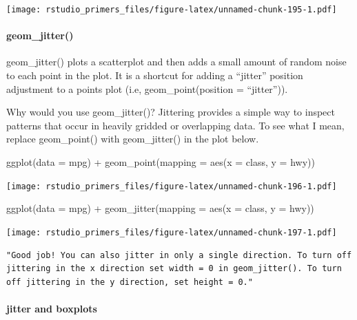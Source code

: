 \documentclass[
]{article}
\newenvironment{Shaded}{\begin{snugshade}}{\end{snugshade}}
\newcommand{\AttributeTok}[1]{\textcolor[rgb]{0.77,0.63,0.00}{#1}}
\newcommand{\FunctionTok}[1]{\textcolor[rgb]{0.00,0.00,0.00}{#1}}
\newcommand{\NormalTok}[1]{#1}
\newcommand{\SpecialCharTok}[1]{\textcolor[rgb]{0.00,0.00,0.00}{#1}}
\begin{document}
\texttt{[image: rstudio\_primers\_files/figure-latex/unnamed-chunk-195-1.pdf]}

\hypertarget{geom_jitter}{%
\paragraph{geom\_jitter()}\label{geom_jitter}}

geom\_jitter() plots a scatterplot and then adds a small amount of
random noise to each point in the plot. It is a shortcut for adding a
``jitter'' position adjustment to a points plot (i.e,
geom\_point(position = ``jitter'')).

Why would you use geom\_jitter()? Jittering provides a simple way to
inspect patterns that occur in heavily gridded or overlapping data. To
see what I mean, replace geom\_point() with geom\_jitter() in the plot
below.

\begin{Shaded}
\begin{Highlighting}[]
\FunctionTok{ggplot}\NormalTok{(}\AttributeTok{data =}\NormalTok{ mpg) }\SpecialCharTok{+}
  \FunctionTok{geom\_point}\NormalTok{(}\AttributeTok{mapping =} \FunctionTok{aes}\NormalTok{(}\AttributeTok{x =}\NormalTok{ class, }\AttributeTok{y =}\NormalTok{ hwy))}
\end{Highlighting}
\end{Shaded}

\texttt{[image: rstudio\_primers\_files/figure-latex/unnamed-chunk-196-1.pdf]}

\begin{Shaded}
\begin{Highlighting}[]
\FunctionTok{ggplot}\NormalTok{(}\AttributeTok{data =}\NormalTok{ mpg) }\SpecialCharTok{+}
  \FunctionTok{geom\_jitter}\NormalTok{(}\AttributeTok{mapping =} \FunctionTok{aes}\NormalTok{(}\AttributeTok{x =}\NormalTok{ class, }\AttributeTok{y =}\NormalTok{ hwy))}
\end{Highlighting}
\end{Shaded}

\texttt{[image: rstudio\_primers\_files/figure-latex/unnamed-chunk-197-1.pdf]}

\begin{verbatim}
"Good job! You can also jitter in only a single direction. To turn off jittering in the x direction set width = 0 in geom_jitter(). To turn off jittering in the y direction, set height = 0."
\end{verbatim}

\hypertarget{jitter-and-boxplots}{%
\paragraph{jitter and boxplots}\label{jitter-and-boxplots}}
\end{document}
